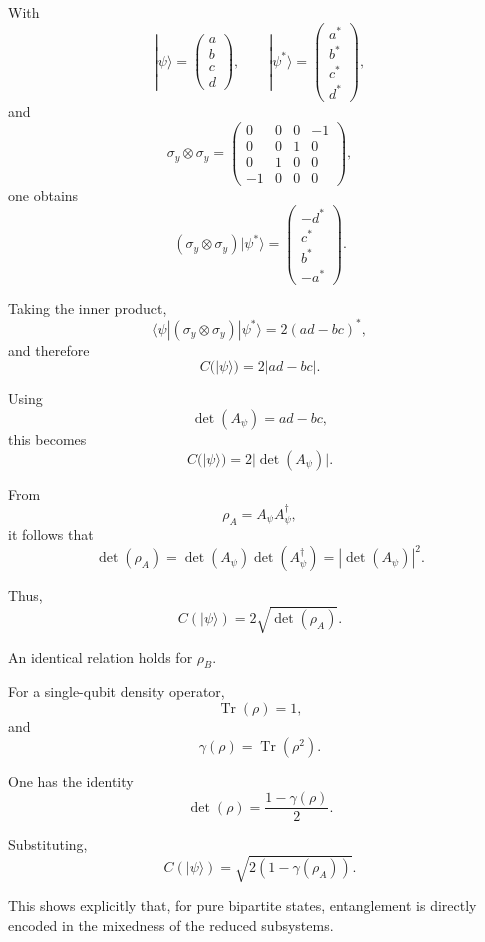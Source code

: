 \documentclass[a4paper]{article}
\begin{document}
With
\[
|\psi\rangle =
\begin{pmatrix}
a\\ b\\ c\\ d
\end{pmatrix},
\qquad
|\psi^*\rangle =
\begin{pmatrix}
a^*\\ b^*\\ c^*\\ d^*
\end{pmatrix},
\]
and
\[
\sigma_y \otimes \sigma_y =
\begin{pmatrix}
0 & 0 & 0 & -1\\
0 & 0 & 1 & 0\\
0 & 1 & 0 & 0\\
-1 & 0 & 0 & 0
\end{pmatrix},
\]
one obtains
\[
(\sigma_y \otimes \sigma_y)|\psi^*\rangle
=
\begin{pmatrix}
- d^*\\
c^*\\
b^*\\
- a^*
\end{pmatrix}.
\]

Taking the inner product,
\[
\langle \psi | (\sigma_y \otimes \sigma_y)|\psi^*\rangle
=
2(ad - bc)^*,
\]
and therefore
\[
C(|\psi\rangle)=2|ad-bc|.
\]

Using
\[
\det(A_\psi) = ad - bc,
\]
this becomes
\[
C(|\psi\rangle)=2|\det(A_\psi)|.
\]

From
\[
\rho_A = A_\psi A_\psi^\dagger,
\]
it follows that
\[
\det(\rho_A)
=
\det(A_\psi)\det(A_\psi^\dagger)
=
|\det(A_\psi)|^2.
\]

Thus,
\[
C(|\psi\rangle)=2\sqrt{\det(\rho_A)}.
\]

An identical relation holds for \(\rho_B\).

For a single-qubit density operator,
\[
\operatorname{Tr}(\rho)=1,
\]
and
\[
\gamma(\rho)=\operatorname{Tr}(\rho^2).
\]

One has the identity
\[
\det(\rho)
=
\frac{1 - \gamma(\rho)}{2}.
\]

Substituting,
\[
C(|\psi\rangle)
=
\sqrt{2\left(1 - \gamma(\rho_A)\right)}.
\]

This shows explicitly that, for pure bipartite states, entanglement is directly encoded in the mixedness of the reduced subsystems.

\end{document}
